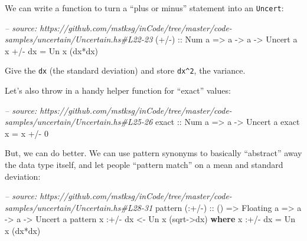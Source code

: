 \documentclass[]{article}
\newenvironment{Shaded}{}{}
\newcommand{\KeywordTok}[1]{\textcolor[rgb]{0.00,0.44,0.13}{\textbf{{#1}}}}
\newcommand{\DataTypeTok}[1]{\textcolor[rgb]{0.56,0.13,0.00}{{#1}}}
\newcommand{\DecValTok}[1]{\textcolor[rgb]{0.25,0.63,0.44}{{#1}}}
\newcommand{\CommentTok}[1]{\textcolor[rgb]{0.38,0.63,0.69}{\textit{{#1}}}}
\newcommand{\OtherTok}[1]{\textcolor[rgb]{0.00,0.44,0.13}{{#1}}}
\newcommand{\FunctionTok}[1]{\textcolor[rgb]{0.02,0.16,0.49}{{#1}}}
\newcommand{\NormalTok}[1]{{#1}}
\begin{document}
We can write a function to turn a ``plus or minus'' statement into an
\texttt{Uncert}:

\begin{Shaded}
\begin{Highlighting}[]
\CommentTok{-- source: https://github.com/mstksg/inCode/tree/master/code-samples/uncertain/Uncertain.hs#L22-23}
\OtherTok{(+/-) ::} \DataTypeTok{Num} \NormalTok{a }\OtherTok{=>} \NormalTok{a }\OtherTok{->} \NormalTok{a }\OtherTok{->} \DataTypeTok{Uncert} \NormalTok{a}
\NormalTok{x }\FunctionTok{+/-} \NormalTok{dx }\FunctionTok{=} \DataTypeTok{Un} \NormalTok{x (dx}\FunctionTok{*}\NormalTok{dx)}
\end{Highlighting}
\end{Shaded}

Give the \texttt{dx} (the standard deviation) and store
\texttt{dx\^{}2}, the variance.

Let's also throw in a handy helper function for ``exact'' values:

\begin{Shaded}
\begin{Highlighting}[]
\CommentTok{-- source: https://github.com/mstksg/inCode/tree/master/code-samples/uncertain/Uncertain.hs#L25-26}
\OtherTok{exact ::} \DataTypeTok{Num} \NormalTok{a }\OtherTok{=>} \NormalTok{a }\OtherTok{->} \DataTypeTok{Uncert} \NormalTok{a}
\NormalTok{exact x }\FunctionTok{=} \NormalTok{x }\FunctionTok{+/-} \DecValTok{0}
\end{Highlighting}
\end{Shaded}

But, we can do better. We can use pattern synonyms to basically
``abstract'' away the data type itself, and let people ``pattern match''
on a mean and standard deviation:

\begin{Shaded}
\begin{Highlighting}[]
\CommentTok{-- source: https://github.com/mstksg/inCode/tree/master/code-samples/uncertain/Uncertain.hs#L28-31}
\NormalTok{pattern}\OtherTok{ (:+/-) ::} \NormalTok{() }\OtherTok{=>} \DataTypeTok{Floating} \NormalTok{a }\OtherTok{=>} \NormalTok{a }\OtherTok{->} \NormalTok{a }\OtherTok{->} \DataTypeTok{Uncert} \NormalTok{a}
\NormalTok{pattern x }\FunctionTok{:+/-} \NormalTok{dx }\OtherTok{<-} \DataTypeTok{Un} \NormalTok{x (sqrt}\OtherTok{->}\NormalTok{dx)}
  \KeywordTok{where}
    \NormalTok{x }\FunctionTok{:+/-} \NormalTok{dx }\FunctionTok{=} \DataTypeTok{Un} \NormalTok{x (dx}\FunctionTok{*}\NormalTok{dx)}
\end{Highlighting}
\end{Shaded}
\end{document}
